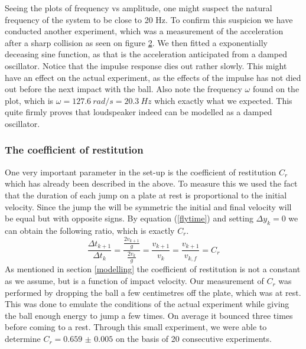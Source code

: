 \documentclass[12pt,oneside,a4paper]{article}
\numberwithin{equation}{section}
\begin{document}
{{{{\begin{figure}[h]
\begin{subfigure}[t]{0.49\textwidth}
		\label{ringout}
	\end{subfigure}
\end{figure}
Seeing the plots of frequency vs amplitude, one might suspect the natural frequency of the system to be close to 20 Hz. To confirm this suspicion we have conducted another experiment, which was a measurement of the acceleration after a sharp collision as seen on figure \ref{ringout}. We then fitted a exponentially deceasing sine function, as that is the acceleration anticipated from a damped oscillator. Notice that the impulse response dies out rather slowly. This might have an effect on the actual experiment, as the effects of the impulse has not died out before the next impact with the ball. Also note the frequency $\omega$ found on the plot, which is $\omega = \SI{127.6}{rad/s} = \SI{20.3}{Hz}$ which exactly what we expected. This quite firmly proves that loudspeaker indeed can be modelled as a damped oscillator.
\subsubsection{The coefficient of restitution}
One very important parameter in the set-up is the coefficient of restitution $C_r$ which has already been described in the above. To measure this we used the fact that the duration of each jump on a plate at rest is proportional to the initial velocity. Since the jump the will be symmetric the initial and final velocity will be equal but with opposite signs. By equation (\ref{flytime}) and setting $\Delta y_k=0$ we can obtain the following ratio, which is exactly $C_r$.
\begin{equation}
	\frac{\Delta t_{k+1}}{\Delta t_{k}}= \frac{\frac{2v_{k+1}}{g}}{\frac{2v_{k}}{g}} = \frac{v_{k+1}}{v_k} = \frac{v_{k+1}}{v_{k,f}} = C_r
\end{equation}
As mentioned in section \ref{modelling} the coefficient of restitution is not a constant as we assume, but is a function of impact velocity. Our measurement of $C_r$ was performed by dropping the ball a few centimetres off the plate, which was at rest. This was done to emulate the conditions of the actual experiment while giving the ball enough energy to jump a few times. On average it bounced three times before coming to a rest. Through this small experiment, we were able to determine $C_r= \num{0.659(5)}$ on the basis of 20 consecutive experiments. 
}}}}
\end{document}
